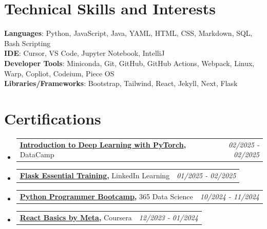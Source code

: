 \documentclass[a4paper,11pt]{article}
\makeatletter
\newcommand{\resumePOR}[3]{
\vspace{0.5mm}\item
    \begin{tabular*}{0.97\textwidth}[t]{l@{\extracolsep{\fill}}r}
        \textbf{#1}\hspace{0.3mm}#2 & \textit{\small{#3}} 
    \end{tabular*}
    \vspace{-2mm}
}
\newcommand{\resumeSubHeadingListStart}{\begin{itemize}[leftmargin=*,labelsep=0mm]}
\newcommand{\resumeSubHeadingListEnd}{\end{itemize}\vspace{2mm}}
\makeatother
\begin{document}
\section{\textbf{Technical Skills and Interests}}
 \begin{itemize}[leftmargin=0.1in, label={}]
    \vspace{1mm}
    \small{\item{
     \textbf{Languages}{: Python, JavaScript, Java, YAML, HTML, CSS, Markdown, SQL, Bash Scripting} \\
     \vspace{1.25mm}
     \textbf{IDE}{: Cursor, VS Code, Jupyter Notebook, IntelliJ} \\
     \vspace{1.25mm}
     \textbf{Developer Tools}{: Miniconda, Git, GitHub, GitHub Actions, Webpack, Linux, Warp, Copliot, Codeium, Piece OS} \\
     \vspace{1.25mm}
     \textbf{Libraries/Frameworks}{: Bootstrap, Tailwind, React, Jekyll, Next, Flask} \\
    }}
 \end{itemize}
\vspace{-4.25mm}




\section{\textbf{Certifications}}
\vspace{-0.4mm}
\resumeSubHeadingListStart
\resumePOR{\href{https://www.datacamp.com/statement-of-accomplishment/course/606c000ab5fe9c34c436d90a6a918f096d4344b9?raw=1}{Introduction to Deep Learning with PyTorch}, }
    {DataCamp}%
    {02/2025 - 02/2025} %
\resumePOR{\href{https://drive.google.com/file/d/1xRRRDEgvRHcJQguLpYpZ9r6mD75OgMPu/view}{Flask Essential Training}, }
    {LinkedIn Learning}%
    {01/2025 - 02/2025} %
\resumePOR{\href{https://learn.365datascience.com/certificates/CC-CD22B5BBA9/}{Python Programmer Bootcamp}, } %
    {365 Data Science} %
    {10/2024 - 11/2024} %
\resumePOR{\href{https://www.coursera.org/account/accomplishments/certificate/YS2WLJJJXK8L}{React Basics by Meta}, } %
    {Coursera} %
    {12/2023 - 01/2024} %
\resumeSubHeadingListEnd
\vspace{-4.5mm}
\end{document}
